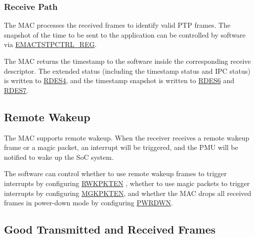 \documentclass[main\_\_EN.tex]{subfiles}
\begin{document}
\subsubsection{Receive Path}

The MAC processes the received frames to identify valid PTP frames. The snapshot of the time to be sent to the application can be controlled by software via \hyperref[regdesc:EMACTIMESTAMPCONTROLREG]{EMACTSTPCTRL\_REG}.

The MAC returns the timestamp to the software inside the corresponding receive descriptor. The extended status (including the timestamp status and IPC status) is written to \hyperref[tab:ethernetmac-RDES4]{RDES4}, and the timestamp snapshot is written to \hyperref[tab:ethernetmac-RDES6]{RDES6} and \hyperref[tab:ethernetmac-RDES7]{RDES7}.

\subsection{Remote Wakeup}
The MAC supports remote wakeup. When the receiver receives a remote wakeup frame or a magic packet, an interrupt will be triggered, and the PMU will be notified to wake up the SoC system.

The software can control whether to use remote wakeup frames to trigger interrupts by configuring  \hyperref[regdesc:PMTCSRREG]{RWKPKTEN} , whether to use magic packets to trigger interrupts by configuring \hyperref[regdesc:PMTCSRREG]{MGKPKTEN}, and whether the MAC drops all received frames in power-down mode by configuring \hyperref[regdesc:PMTCSRREG]{PWRDWN}.

\subsection{Good Transmitted and Received Frames}
\end{document}
